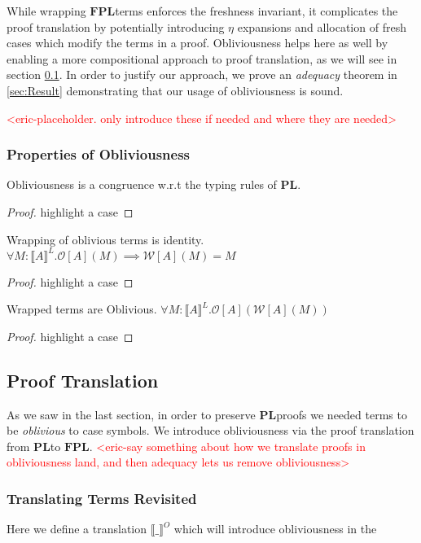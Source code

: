 \documentclass[acmsmall]{acmart}
\newcommand{\den}[1]{\llbracket #1\rrbracket}
\newcommand{\eric}[1]{\textcolor{red}{ <eric-#1> }}
\newcommand{\pl}{$\mathbf{PL}$}
\newcommand{\fpl}{$\mathbf{FPL}$}
\begin{document}
While wrapping \fpl\;terms enforces the freshness invariant, it complicates the proof translation by potentially introducing $\eta$ expansions and allocation of fresh cases which modify the terms in a proof. Obliviousness helps here as well by enabling a more compositional approach to proof translation, as we will see in section \cref{sec:ProofTranslation}. In order to justify our approach, we prove an \textit{adequacy} theorem in \cref{sec:Result} demonstrating that our usage of obliviousness is sound.

\eric{placeholder. only introduce these if needed and where they are needed}
\subsubsection{Properties of Obliviousness}
\begin{theorem}
  Obliviousness is a congruence w.r.t the typing rules of \pl.
\end{theorem}
\begin{proof}
  highlight a case
\end{proof}

\begin{theorem} Wrapping of oblivious terms is identity.
 $\forall M : \den{A}^L. \mathcal{O}[A](M) \implies \mathcal{W}[A](M) = M$
\end{theorem}

\begin{proof}
  highlight a case
\end{proof}


\begin{theorem} Wrapped terms are Oblivious.
  $\forall M : \den{A}^L. \mathcal{O}[A](\mathcal{W}[A](M))$
 \end{theorem}
 
 \begin{proof}
   highlight a case
 \end{proof}


\subsection{Proof Translation}\label{sec:ProofTranslation}
As we saw in the last section, in order to preserve \pl\;proofs we needed terms to be \textit{oblivious} to case symbols. We introduce obliviousness via the proof translation from \pl\;to \fpl. 
\eric{say something about how we translate proofs in obliviousness land, and then adequacy lets us remove obliviousness}

\subsubsection{Translating Terms Revisited}
Here we define a translation $\den{\_}^O$ which will introduce obliviousness in the 
\end{document}
